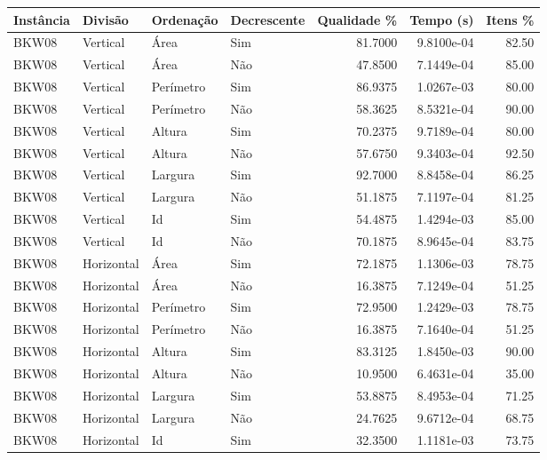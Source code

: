 \begin{tabular}{llllrrr}
\hline
Instância & Divisão     & Ordenação & Decrescente & Qualidade \% & Tempo (s)  & Itens \% \\
\hline
BKW08     & Vertical    & Área      & Sim         & 81.7000      & 9.8100e-04 & 82.50    \\
BKW08     & Vertical    & Área      & Não         & 47.8500      & 7.1449e-04 & 85.00    \\
BKW08     & Vertical    & Perímetro & Sim         & 86.9375      & 1.0267e-03 & 80.00    \\
BKW08     & Vertical    & Perímetro & Não         & 58.3625      & 8.5321e-04 & 90.00    \\
BKW08     & Vertical    & Altura    & Sim         & 70.2375      & 9.7189e-04 & 80.00    \\
BKW08     & Vertical    & Altura    & Não         & 57.6750      & 9.3403e-04 & 92.50    \\
BKW08     & Vertical    & Largura   & Sim         & 92.7000      & 8.8458e-04 & 86.25    \\
BKW08     & Vertical    & Largura   & Não         & 51.1875      & 7.1197e-04 & 81.25    \\
BKW08     & Vertical    & Id        & Sim         & 54.4875      & 1.4294e-03 & 85.00    \\
BKW08     & Vertical    & Id        & Não         & 70.1875      & 8.9645e-04 & 83.75    \\
BKW08     & Horizontal  & Área      & Sim         & 72.1875      & 1.1306e-03 & 78.75    \\
BKW08     & Horizontal  & Área      & Não         & 16.3875      & 7.1249e-04 & 51.25    \\
BKW08     & Horizontal  & Perímetro & Sim         & 72.9500      & 1.2429e-03 & 78.75    \\
BKW08     & Horizontal  & Perímetro & Não         & 16.3875      & 7.1640e-04 & 51.25    \\
BKW08     & Horizontal  & Altura    & Sim         & 83.3125      & 1.8450e-03 & 90.00    \\
BKW08     & Horizontal  & Altura    & Não         & 10.9500      & 6.4631e-04 & 35.00    \\
BKW08     & Horizontal  & Largura   & Sim         & 53.8875      & 8.4953e-04 & 71.25    \\
BKW08     & Horizontal  & Largura   & Não         & 24.7625      & 9.6712e-04 & 68.75    \\
BKW08     & Horizontal  & Id        & Sim         & 32.3500      & 1.1181e-03 & 73.75    \\

\end{tabular}
